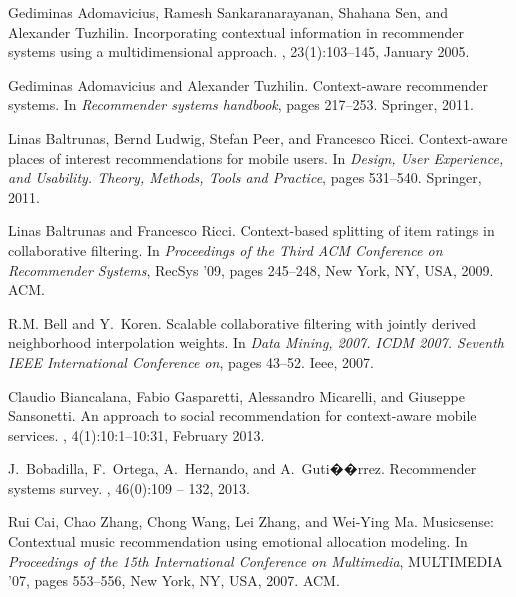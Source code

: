 \documentclass[preprint,12pt]{elsarticle}
\begin{document}
\begin{thebibliography}{10}

Gediminas Adomavicius, Ramesh Sankaranarayanan, Shahana Sen, and Alexander
  Tuzhilin.
\newblock Incorporating contextual information in recommender systems using a
  multidimensional approach.
, 23(1):103--145, January 2005.

Gediminas Adomavicius and Alexander Tuzhilin.
\newblock Context-aware recommender systems.
\newblock In {\em Recommender systems handbook}, pages 217--253. Springer,
  2011.

Linas Baltrunas, Bernd Ludwig, Stefan Peer, and Francesco Ricci.
\newblock Context-aware places of interest recommendations for mobile users.
\newblock In {\em Design, User Experience, and Usability. Theory, Methods,
  Tools and Practice}, pages 531--540. Springer, 2011.

Linas Baltrunas and Francesco Ricci.
\newblock Context-based splitting of item ratings in collaborative filtering.
\newblock In {\em Proceedings of the Third ACM Conference on Recommender
  Systems}, RecSys '09, pages 245--248, New York, NY, USA, 2009. ACM.

R.M. Bell and Y.~Koren.
\newblock Scalable collaborative filtering with jointly derived neighborhood
  interpolation weights.
\newblock In {\em Data Mining, 2007. ICDM 2007. Seventh IEEE International
  Conference on}, pages 43--52. Ieee, 2007.

Claudio Biancalana, Fabio Gasparetti, Alessandro Micarelli, and Giuseppe
  Sansonetti.
\newblock An approach to social recommendation for context-aware mobile
  services.
, 4(1):10:1--10:31, February
  2013.

J.~Bobadilla, F.~Ortega, A.~Hernando, and A.~Guti��rrez.
\newblock Recommender systems survey.
, 46(0):109 -- 132, 2013.

Rui Cai, Chao Zhang, Chong Wang, Lei Zhang, and Wei-Ying Ma.
\newblock Musicsense: Contextual music recommendation using emotional
  allocation modeling.
\newblock In {\em Proceedings of the 15th International Conference on
  Multimedia}, MULTIMEDIA '07, pages 553--556, New York, NY, USA, 2007. ACM.


\end{thebibliography}
\end{document}
